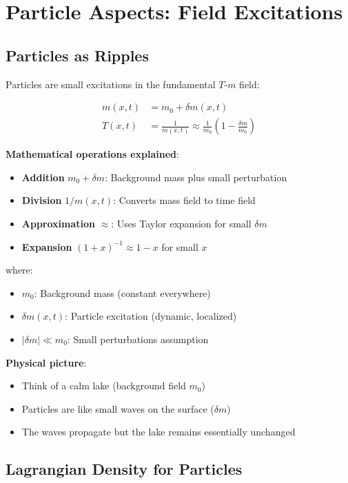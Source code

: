 \documentclass[12pt,a4paper]{article}
\newcommand{\Tfield}{T(x,t)}
\newcommand{\mfield}{m(x,t)}
\newcommand{\deltam}{\delta m}
\theoremstyle{definition}
\theoremstyle{remark}
\begin{document}
	\section{Particle Aspects: Field Excitations}
	
	\subsection{Particles as Ripples}
	
	Particles are small excitations in the fundamental $T$-$m$ field:
	
	\begin{align}
		\mfield &= m_0 + \deltam(x,t) \\
		\Tfield &= \frac{1}{\mfield} \approx \frac{1}{m_0}\left(1 - \frac{\deltam}{m_0}\right)
	\end{align}
	
	\textbf{Mathematical operations explained}:
	\begin{itemize}
		\item \textbf{Addition} $m_0 + \deltam$: Background mass plus small perturbation
		\item \textbf{Division} $1/\mfield$: Converts mass field to time field
		\item \textbf{Approximation} $\approx$: Uses Taylor expansion for small $\deltam$
		\item \textbf{Expansion} $(1 + x)^{-1} \approx 1 - x$ for small $x$
	\end{itemize}
	
	where:
	\begin{itemize}
		\item $m_0$: Background mass (constant everywhere)
		\item $\deltam(x,t)$: Particle excitation (dynamic, localized)
		\item $|\deltam| \ll m_0$: Small perturbations assumption
	\end{itemize}
	
	\textbf{Physical picture}: 
	\begin{itemize}
		\item Think of a calm lake (background field $m_0$)
		\item Particles are like small waves on the surface ($\deltam$)
		\item The waves propagate but the lake remains essentially unchanged
	\end{itemize}
	
	\subsection{Lagrangian Density for Particles}
	
\end{document}

